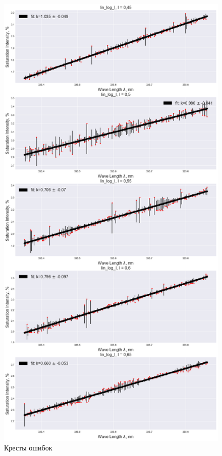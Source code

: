 \documentclass[a4paper,12pt]{article}
\begin{document}
\newpage
	\begin{figure}[H]
		\begin{center}
			\includegraphics[scale=0.4]{I_dep_error}
			\caption{ Кресты ошибок}
		\end{center}
	\end{figure}
	
\end{document}
